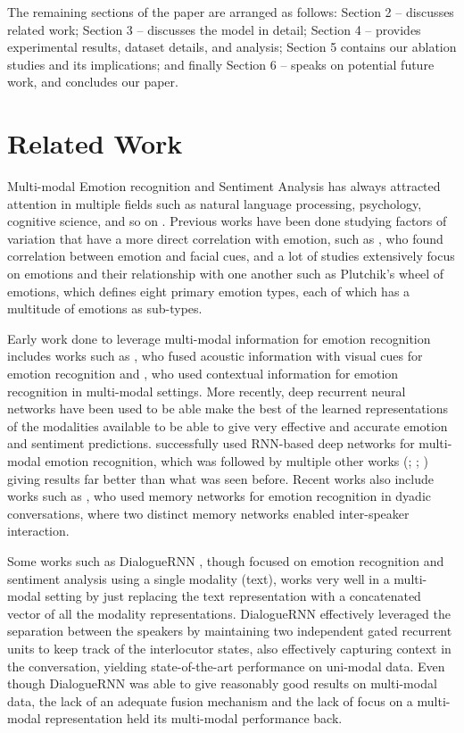 \documentclass[11pt,a4paper]{article}
\begin{document}
The remaining sections of the paper are arranged as follows: Section 2 – discusses related work; Section 3 – discusses the model in detail; Section 4 – provides experimental results, dataset details, and analysis; Section 5 contains our ablation studies and its implications; and finally Section 6 – speaks on potential future work, and concludes our paper.

\section{Related Work}

Multi-modal Emotion recognition and Sentiment Analysis has always attracted attention in multiple fields such as natural language processing, psychology, cognitive science, and so on \cite{picard}. Previous works have been done studying factors of variation that have a more direct correlation with emotion, such as \citet{ekman}, who found correlation between emotion and facial cues, and a lot of studies extensively focus on emotions and their relationship with one another such as Plutchik’s wheel of emotions, which defines eight primary emotion types, each of which has a multitude of emotions as sub-types.

Early work done to leverage multi-modal information for emotion recognition includes works such as \citet{datcu}, who fused acoustic information with visual cues for emotion recognition and \citet{opensmile}, who used contextual information for emotion recognition in multi-modal settings. More recently, deep recurrent neural networks have been used to be able make the best of the learned representations of the modalities available to be able to give very effective and accurate emotion and sentiment predictions. \citet{poria2} successfully used RNN-based deep networks for multi-modal emotion recognition, which was followed by multiple other works (\citealp{chen}; \citealp{mfn}; \citealp{zadeh3}) giving results far better than what was seen before. Recent works also include works such as \citet{hazarika}, who used memory networks for emotion recognition in dyadic conversations, where two distinct memory networks enabled inter-speaker interaction. 

Some works such as DialogueRNN \cite{dialoguernn}, though focused on emotion recognition and sentiment analysis using a single modality (text), works very well in a multi-modal setting by just replacing the text representation with a concatenated vector of all the modality representations. DialogueRNN effectively leveraged the separation between the speakers by maintaining two independent gated recurrent units to keep track of the interlocutor states, also effectively capturing context in the conversation, yielding state-of-the-art performance on uni-modal data. Even though DialogueRNN was able to give reasonably good results on multi-modal data, the lack of an adequate fusion mechanism and the lack of focus on a multi-modal representation held its multi-modal performance back. 
\end{document}
